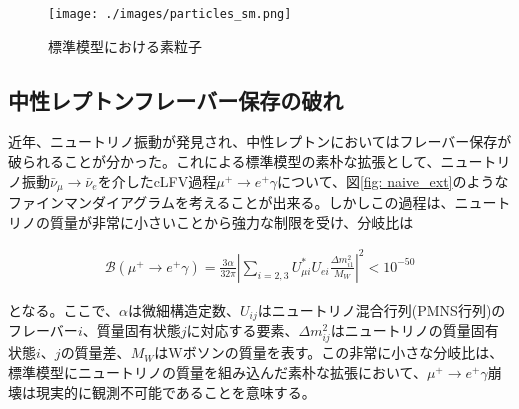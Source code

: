 \documentclass[Yonemoto_master.tex]{subfiles}
\begin{document}
\begin{figure}[h]
\begin{center}
\texttt{[image: ./images/particles\_sm.png]}
\caption{標準模型における素粒子 \cite{particles_sm}}
\label{fig: sm_par}
\end{center}
\end{figure}



\subsection{中性レプトンフレーバー保存の破れ}
近年、ニュートリノ振動が発見され\cite{nu_osc}、中性レプトンにおいてはフレーバー保存が破られることが分かった。これによる標準模型の素朴な拡張として、ニュートリノ振動$\bar{\nu}_{\mu} \to \bar{\nu}_{e}$を介したcLFV過程$\mu^+ \to e^+ \gamma$について、図\ref{fig: naive_ext}のようなファインマンダイアグラムを考えることが出来る。しかしこの過程は、ニュートリノの質量が非常に小さいことから強力な制限を受け、分岐比は

\begin{align}
\mathcal{B}(\mu^+ \to e^+ \gamma) = \frac{3\alpha}{32\pi} \left|\sum_{i=2,3}U^*_{\mu i}U_{ei}\frac{\Delta m^2_{i1}}{M_W}\right|^2 < 10^{-50}
\end{align}

\noindent となる\cite{rare_lep}。ここで、$\alpha$は微細構造定数、$U_{ij}$はニュートリノ混合行列(PMNS行列)のフレーバー$i$、質量固有状態$j$に対応する要素、$\Delta m^2_{ij}$はニュートリノの質量固有状態$i$、$j$の質量差、$M_W$はWボソンの質量を表す。この非常に小さな分岐比は、標準模型にニュートリノの質量を組み込んだ素朴な拡張において、$\mu^+ \to e^+ \gamma$崩壊は現実的に観測不可能であることを意味する。
\end{document}
